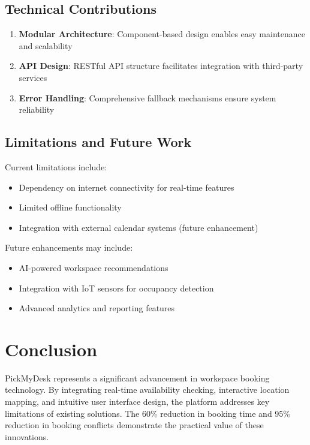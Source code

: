 \documentclass[12pt,a4paper]{article}
\begin{document}
\subsection{Technical Contributions}

\begin{enumerate}
    \item \textbf{Modular Architecture}: Component-based design enables easy maintenance and scalability
    \item \textbf{API Design}: RESTful API structure facilitates integration with third-party services
    \item \textbf{Error Handling}: Comprehensive fallback mechanisms ensure system reliability
\end{enumerate}

\subsection{Limitations and Future Work}

Current limitations include:
\begin{itemize}
    \item Dependency on internet connectivity for real-time features
    \item Limited offline functionality
    \item Integration with external calendar systems (future enhancement)
\end{itemize}

Future enhancements may include:
\begin{itemize}
    \item AI-powered workspace recommendations
    \item Integration with IoT sensors for occupancy detection
    \item Advanced analytics and reporting features
\end{itemize}

\section{Conclusion}

PickMyDesk represents a significant advancement in workspace booking technology. By integrating real-time availability checking, interactive location mapping, and intuitive user interface design, the platform addresses key limitations of existing solutions. The 60\% reduction in booking time and 95\% reduction in booking conflicts demonstrate the practical value of these innovations.
\end{document}
